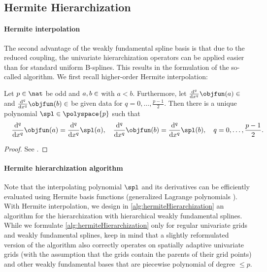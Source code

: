 \subsection{Hermite Hierarchization}
\label{sec:455hermiteHierarchization}

\paragraph{Hermite interpolation}

The second advantage of the weakly fundamental spline basis
is that due to the reduced coupling,
the univariate hierarchization operators can be applied easier
than for standard uniform B-splines.
This results in the formulation of the so-called
 algorithm.
We first recall higher-order Hermite interpolation:

\begin{lemma}
  \label{lemma:hermiteInterpolation}
  Let $p \in \nat$ be odd and $a, b \in \real$ with $a < b$.
  Furthermore, let
  $\frac{\diff^q}{\dx^q} \objfun(a) \in \real$ and
  $\frac{\diff^q}{\dx^q} \objfun(b) \in \real$ be given data
  for $q = 0, \dotsc, \frac{p-1}{2}$.
  Then there is a unique polynomial $\spl \in \polyspace{p}$ such that
  \begin{equation}
    \frac{\diff^q}{\dx^q} \objfun(a)
    = \frac{\diff^q}{\dx^q} \spl(a),\quad
    \frac{\diff^q}{\dx^q} \objfun(b)
    = \frac{\diff^q}{\dx^q} \spl(b),\quad
    q = 0, \dotsc, \frac{p-1}{2}.
    \hspace*{-10mm}
  \end{equation}
\end{lemma}

\begin{proof}
  See \cite{Freund07Stoer}.
\end{proof}

\paragraph{Hermite hierarchization algorithm}

Note that the interpolating polynomial $\spl$ and its derivatives can be
efficiently evaluated using Hermite basis functions
(generalized Lagrange polynomials \cite{Freund07Stoer}).
With Hermite interpolation, we design
in \cref{alg:hermiteHierarchization} an algorithm
for the hierarchization with hierarchical weakly fundamental splines.
While we formulate \cref{alg:hermiteHierarchization}
only for regular univariate grids and weakly fundamental splines,
keep in mind that a slightly reformulated version of the algorithm
also correctly operates on spatially adaptive univariate grids
(with the assumption that the grids contain the parents of their grid points)
and other weakly fundamental bases that are
piecewise polynomial of degree $\le p$.

